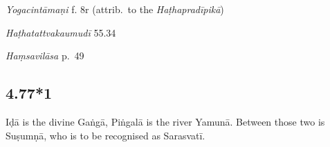 \begin{ekdosis}

\begin{testimonia}[hp04_077]
\emph{Yogacintāmaṇi} f. 8r (attrib.~to the \emph{Haṭhapradīpikā})
\begin{versinnote}
\end{versinnote}

\emph{Haṭhatattvakaumudī} 55.34
\begin{versinnote}
\end{versinnote}

\emph{Haṃsavilāsa} p.~49
\begin{versinnote}
\end{versinnote}
\end{testimonia}


\subsection*{4.77*1}
\begin{translation}[hp04_077_1]
Iḍā is the divine Gaṅgā, Piṅgalā is the river Yamunā. Between those two is Suṣumṇā, who is to be recognised as Sarasvatī.
\end{translation}





\end{ekdosis}
